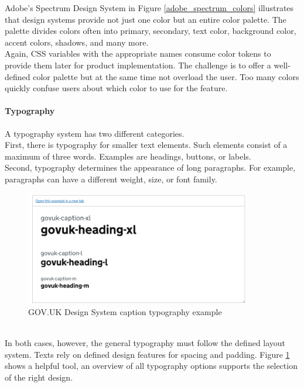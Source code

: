 Adobe's Spectrum Design System in Figure \ref{adobe_spectrum_colors} illustrates that design systems provide not just one color but an entire color palette. The palette divides colors often into primary, secondary, text color, background color, accent colors, shadows, and many more. \\
Again, \ac{CSS} variables with the appropriate names consume color tokens to provide them later for product implementation. The challenge is to offer a well-defined color palette but at the same time not overload the user. Too many colors quickly confuse users about which color to use for the feature. \cite{vesselov_building_2019}

\paragraph{Typography}
A typography system has two different categories. \\
First, there is typography for smaller text elements. Such elements consist of a maximum of three words. Examples are headings, buttons, or labels. \\
Second, typography determines the appearance of long paragraphs. For example, paragraphs can have a different weight, size, or font family. 
\begin{figure}[hbtp]
	\centerline{\includegraphics[height=5cm]{images/gov_uk_typo.png}}
	\caption{GOV.UK Design System caption typography example \cite{govuk_govuk_nodate}}
	\label{gov_uk_typo}
\end{figure} \\
In both cases, however, the general typography must follow the defined layout system. Texts rely on defined design features for spacing and padding. Figure \ref{gov_uk_typo} shows a helpful tool, an overview of all typography options supports the selection of the right design.  \cite{vesselov_building_2019}


